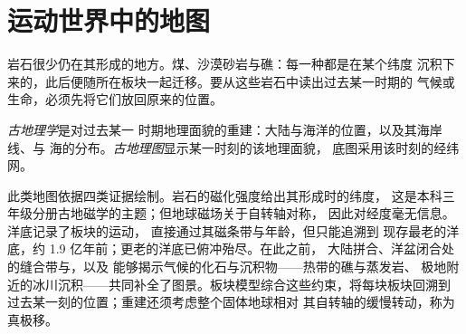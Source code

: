 \section{运动世界中的地图}\label{sec:b2:phanerozoic-earth:maps}

岩石很少仍在其形成的地方。煤、沙漠砂岩与礁：每一种都是在某个纬度
沉积下来的，此后便随所在板块一起迁移。要从这些岩石中读出过去某一时期的
气候或生命，必须先将它们放回原来的位置。

\begin{definition}\label{def:b2:phanerozoic-earth:palaeogeography}
\emph{古地理学}是对过去某一
时期地理面貌的重建：大陆与海洋的位置，以及其海岸线、与
海的分布。\emph{古地理图}显示某一时刻的该地理面貌，
底图采用该时刻的经纬网。
\end{definition}

此类地图依据四类证据绘制。岩石的磁化强度给出其形成时的纬度，
这是本科三年级分册古地磁学的主题；但地球磁场关于自转轴对称，
因此对经度毫无信息。洋底记录了板块的运动，
直接通过其磁条带与年龄，但只能追溯到
现存最老的洋底，约 1.9 亿年前；更老的洋底已俯冲殆尽。在此之前，
大陆拼合、洋盆闭合处的缝合带与，以及
能够揭示气候的化石与沉积物——热带的礁与蒸发岩、
极地附近的冰川沉积——共同补全了图景。板块模型综合这些约束，将每块板块回溯到
过去某一刻的位置；重建还须考虑整个固体地球相对
其自转轴的缓慢转动，称为真极移。

